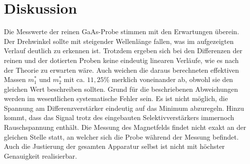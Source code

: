 \section{Diskussion}
\label{sec:Diskussion}
Die Messwerte der reinen GaAs-Probe stimmen mit den Erwartungen überein. Der
Drehwinkel sollte mit steigender Wellenlänge fallen, was im aufgezeigten Verlauf
deutlich zu erkennen ist. Trotzdem ergeben sich bei den Differenzen der reinen
und der dotierten Proben keine eindeutig linearen Verläufe, wie es nach der
Theorie zu erwarten wäre. Auch weichen die daraus berechneten effektiven Massen
$m^*_1$ und $m^*_2$ mit ca. $11,25\%$ merklich voneinander ab, obwohl sie den
gleichen Wert beschreiben sollten. Grund für die beschriebenen Abweichungen werden
im wesentlichen systematische Fehler sein. Es ist nicht möglich, die Spannung am
Differenzverstärker eindeutig auf das Minimum abzuregeln. Hinzu kommt, dass das Signal
trotz des eingebauten Selektivverstärkers immernoch Rauschspannung enthält. Die
Messung des Magnetfelds findet nicht exakt an der gleichen Stelle statt, an welcher
sich die Probe während der Messung befindet. Auch die Justierung
der gesamten Apparatur selbst ist nicht mit höchster Genauigkeit realisierbar.
